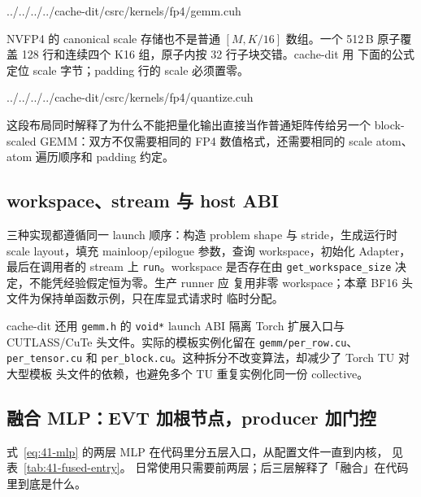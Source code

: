 \begin{lstinputlisting}[linerange={287-320},firstnumber=auto,
  title={cache-dit fp4/gemm.cuh L287--320（打包 K、scale layout 与 EVT 参数）}]{../../../../cache-dit/csrc/kernels/fp4/gemm.cuh}
\end{lstinputlisting}

NVFP4 的 canonical scale 存储也不是普通 $[M,K/16]$ 数组。一个 512\,B
原子覆盖 128 行和连续四个 K16 组，原子内按 32 行子块交错。cache-dit 用
下面的公式定位 scale 字节；padding 行的 scale 必须置零。

\begin{lstinputlisting}[linerange={69-82},firstnumber=auto,
  title={cache-dit fp4/quantize.cuh L69--82（NVFP4 的 512 B scale 原子）}]{../../../../cache-dit/csrc/kernels/fp4/quantize.cuh}
\end{lstinputlisting}

这段布局同时解释了为什么不能把量化输出直接当作普通矩阵传给另一个
block-scaled GEMM：双方不仅需要相同的 FP4 数值格式，还需要相同的 scale
atom、atom 遍历顺序和 padding 约定。

\subsection{workspace、stream 与 host ABI}

三种实现都遵循同一 launch 顺序：构造 problem shape 与 stride，生成运行时
scale layout，填充 mainloop/epilogue 参数，查询 workspace，初始化 Adapter，
最后在调用者的 stream 上 \texttt{run}。workspace 是否存在由
\texttt{get\_workspace\_size} 决定，不能凭经验假定恒为零。生产 runner 应
复用非零 workspace；本章 BF16 头文件为保持单函数示例，只在库显式请求时
临时分配。

cache-dit 还用 \texttt{gemm.h} 的 \texttt{void*} launch ABI 隔离 Torch
扩展入口与 CUTLASS/CuTe 头文件。实际的模板实例化留在
\texttt{gemm/per\_row.cu}、\texttt{per\_tensor.cu} 和
\texttt{per\_block.cu}。这种拆分不改变算法，却减少了 Torch TU 对大型模板
头文件的依赖，也避免多个 TU 重复实例化同一份 collective。

\subsection{融合 MLP：EVT 加根节点，producer 加门控}

式~\ref{eq:41-mlp} 的两层 MLP 在代码里分五层入口，从配置文件一直到内核，
见表~\ref{tab:41-fused-entry}。
日常使用只需要前两层；后三层解释了「融合」在代码里到底是什么。

